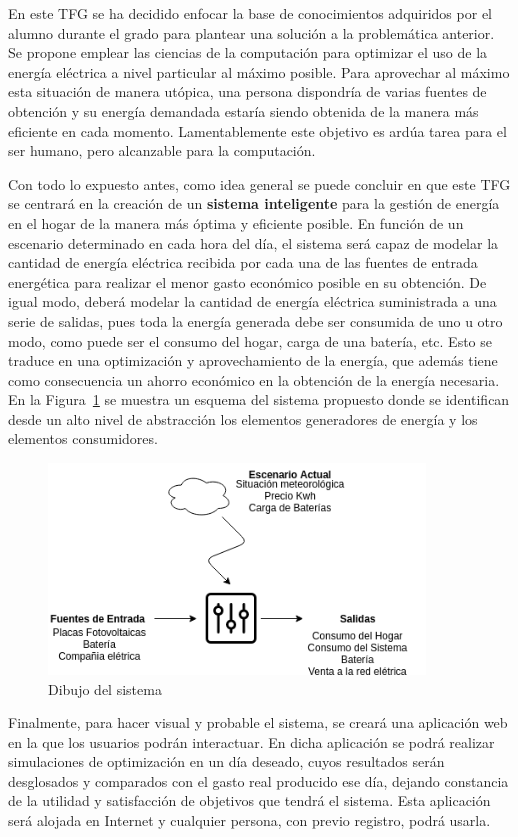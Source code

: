 En este \gls{TFG} se ha decidido enfocar la base de conocimientos adquiridos por el alumno durante el grado para plantear una solución a la problemática anterior. Se propone emplear las ciencias de la computación para optimizar el uso de la energía eléctrica a nivel particular al máximo posible. Para aprovechar al máximo esta situación de manera utópica, una persona dispondría de varias fuentes de obtención y su energía demandada estaría siendo obtenida de la manera más eficiente en cada momento. Lamentablemente este objetivo es ardúa tarea para el ser humano, pero alcanzable para la computación.

Con todo lo expuesto antes, como idea general se puede concluir en que este \gls{TFG} se centrará en la creación de un \textbf{sistema inteligente} para la gestión de energía en el hogar de la manera más óptima y eficiente posible. En función de un escenario determinado en cada hora del día, el sistema será capaz de modelar la cantidad de energía eléctrica recibida por cada una de las fuentes de entrada energética para realizar el menor gasto económico posible en su obtención. De igual modo, deberá modelar la cantidad de energía eléctrica suministrada a una serie de salidas, pues toda la energía generada debe ser consumida de uno u otro modo, como puede ser el consumo del hogar, carga de una batería, etc. Esto se traduce en una optimización y aprovechamiento de la energía, que además tiene como consecuencia un ahorro económico en la obtención de la energía necesaria. En la Figura~\ref{fig:abstract} se muestra un esquema del sistema propuesto donde se identifican desde un alto nivel de abstracción los elementos generadores de energía y los elementos consumidores.\\
\begin{figure}[!h]
	\centering
	\includegraphics[width=10cm]{figs/Abstract.png}
	\caption{Dibujo del sistema}
        \label{fig:abstract}
\end{figure}

Finalmente, para hacer visual y probable el sistema, se creará una aplicación web en la que los usuarios podrán interactuar. En dicha aplicación se podrá realizar simulaciones de optimización en un día deseado, cuyos resultados serán desglosados y comparados con el gasto real producido ese día, dejando constancia de la utilidad y satisfacción de objetivos que tendrá el sistema. Esta aplicación será alojada en Internet y cualquier persona, con previo registro, podrá usarla.\\

